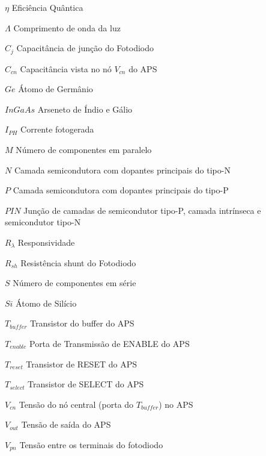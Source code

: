\begin{simbolos}
  \item[$ \eta $] Eficiência Quântica
  \item[$ \Lambda $] Comprimento de onda da luz
  \item[$ C_j $] Capacitância de junção do Fotodiodo
  \item[$ C_{cn}$] Capacitância vista no nó $V_{cn}$ do APS
  \item[$ Ge $] Átomo de Germânio
  \item[$ InGaAs $] Arseneto de Índio e Gálio
  \item[$ I_{PH} $] Corrente fotogerada
  \item[$ M $] Número de componentes em paralelo
  \item[$ N $] Camada semicondutora com dopantes principais do tipo-N
  \item[$ P $] Camada semicondutora com dopantes principais do tipo-P
  \item[$ PIN $] Junção de camadas de semicondutor tipo-P, camada intrínseca e semicondutor tipo-N
  \item[$ R_\lambda $] Responsividade
  \item[$ R_{sh} $] Resistência shunt do Fotodiodo
  \item[$ S $] Número de componentes em série
  \item[$ Si $] Átomo de Silício
  \item[$ T_{buffer} $] Transistor do buffer do APS
  \item[$ T_{enable} $] Porta de Transmissão de ENABLE do APS
  \item[$ T_{reset} $] Transistor de RESET do APS
  \item[$ T_{select} $] Transistor de SELECT do APS
  
  
  \item[$ V_{cn} $] Tensão do nó central (porta do $T_{buffer}$) no APS
  \item[$ V_{out} $] Tensão de saída do APS
  \item[$V_{pn}$] Tensão entre os terminais do fotodiodo
  
\end{simbolos}

